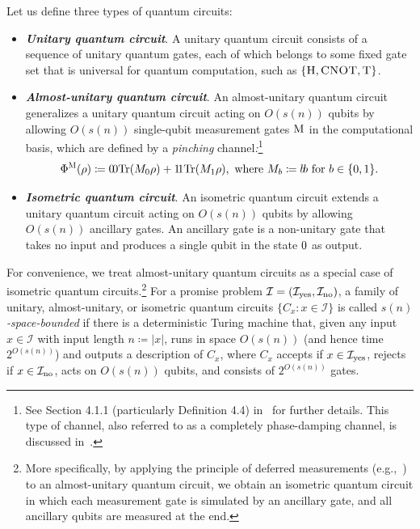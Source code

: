 \documentclass[10pt,a4paper]{article}
\numberwithin{equation}{section}
\numberwithin{figure}{section}
\DeclarePairedDelimiter\rbra{\lparen}{\rparen}
\let\ket\relax\DeclarePairedDelimiter\ket{\lvert}{\rangle}
\let\bra\relax\DeclarePairedDelimiter\bra{\langle}{\rvert}
\newcommand{\ketbra}[2]{\ensuremath{\ket{#1}\!\bra{#2}}}
\newcommand{\Tr}{\mathrm{Tr}}
\newcommand{\yes}{{\rm yes}}
\newcommand{\no}{{\rm no}}
\newcommand{\Had}{\textnormal{\textsc{H}}\xspace}
\newcommand{\CNOT}{\textnormal{\textsc{CNOT}}\xspace}
\newcommand{\M}{\textnormal{\textsc{M}}\xspace}
\newcommand{\T}{\textnormal{\textsc{T}}\xspace}
\newcommand{\binset}{\{0,1\}}
\newcommand{\calI}{\mathcal{I}}
\begin{document}
\begin{definition}
    \label{def:space-bounded-quantum-circuits}
    Let us define three types of quantum circuits: 
    \begin{itemize}[itemsep=0.33em, topsep=0.33em, parsep=0.33em, leftmargin=2em]
        \item \emph{\textbf{Unitary quantum circuit}}. A unitary quantum circuit consists of a sequence of unitary quantum gates, each of which belongs to some fixed gate set that is universal for quantum computation, such as $\{\Had, \CNOT, \T\}$. 
        \item \emph{\textbf{Almost-unitary quantum circuit}}. An almost-unitary quantum circuit generalizes a unitary quantum circuit acting on $O(s(n))$ qubits by allowing $O(s(n))$ single-qubit measurement gates $\M$ in the computational basis, which are defined by a \emph{pinching} channel\emph{:}\footnote{See Section 4.1.1 (particularly Definition 4.4) in~\cite{Watrous18} for further details. This type of channel, also referred to as a completely phase-damping channel, is discussed in~\cite[Equation (2.24)]{VW16}.} %
        \[\Phi^{\M}(\rho) \coloneqq \ketbra{0}{0} \Tr\rbra*{M_0 \rho} + \ketbra{1}{1} \Tr\rbra*{M_1 \rho}, \text{ where } M_b \coloneqq \ketbra{b}{b} \text{ for } b\in\binset.\] 
 
        \item \emph{\textbf{Isometric quantum circuit}}. An isometric quantum circuit extends a unitary quantum circuit acting on $O(s(n))$ qubits by allowing $O(s(n))$ ancillary gates. An ancillary gate is a non-unitary gate that takes no input and produces a single qubit in the state $\ket{0}$ as output. 
    \end{itemize}
    For convenience, we treat almost-unitary quantum circuits as a special case of isometric quantum circuits.\footnote{More specifically, by applying the principle of deferred measurements (e.g.,~\cite[Section 4.4]{NC10}) to an almost-unitary quantum circuit, we obtain an isometric quantum circuit in which each measurement gate is simulated by an ancillary gate, and all ancillary qubits are measured at the end.\label{footref:almost-unitary-is-isometry}}
    For a promise problem $\calI = (\calI_{\yes},\calI_{\no})$, a family of unitary, almost-unitary, or isometric quantum circuits $\{C_x: x\in \calI\}$ is called \emph{$s(n)$-space-bounded} if there is a deterministic Turing machine that, given any input $x \in \calI$ with input length $n \coloneqq |x|$, runs in space $O(s(n))$ (and hence time $2^{O(s(n))}$) and outputs a description of $C_x$, where $C_x$ accepts if $x \in \calI_{\yes}$, rejects if $x \in \calI_{\no}$, acts on $O(s(n))$ qubits, and consists of $2^{O(s(n))}$ gates.
\end{definition}
\end{document}
